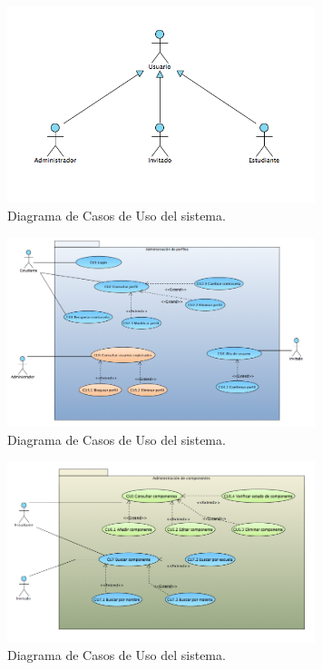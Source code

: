 \documentclass[oneside,10pt]{book}
\begin{document}
	\begin{figure}[htbp!]
		\centering
			\includegraphics[width=0.8\textwidth]{images/CasosDeUso}
		\caption{Diagrama de Casos de Uso del sistema.}
	\end{figure}
	
	\begin{figure}[htbp!]
		\centering
			\includegraphics[width=0.8\textwidth]{images/CasosDeUso1}
		\caption{Diagrama de Casos de Uso del sistema.}
	\end{figure}
	
	\begin{figure}[htbp!]
		\centering
			\includegraphics[width=0.8\textwidth]{images/CasosDeUso2}
		\caption{Diagrama de Casos de Uso del sistema.}
	\end{figure}
	
\end{document}

